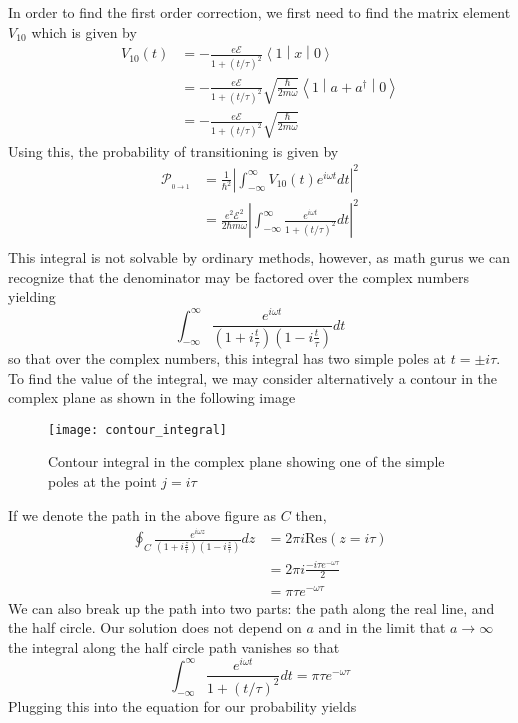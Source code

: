 \documentclass[a4paper, 11pt]{article}
\newcommand{\E}{\mathcal{E}}
\newcommand{\prob}[2]{\mathcal{P}_{_{#1\rightarrow #2}}}
\newcommand{\matrixel}[3]{\ensuremath{\left\langle #1 \middle| #2 \middle| #3 \right\rangle}}
\newenvironment{solution}{%
	\begin{list}{}{%
			\setlength{\topsep}{0pt}%
			\setlength{\leftmargin}{0.5cm}%
			\setlength{\rightmargin}{0.5cm}%
			\setlength{\listparindent}{\parindent}%
			\setlength{\itemindent}{\parindent}%
			\setlength{\parsep}{\parskip}%
		}%
		\item[]}{\end{list}}
\begin{document}
\begin{enumerate}[leftmargin=0em, label=\textbf{\arabic*}]
    \begin{solution}
      In order to find the first order correction, we first need to find the
      matrix element $V_{10}$ which is given by
      \begin{align}
        V_{10}(t) &= -\frac{e\E}{1+(t/\tau)^2}\matrixel{1}{x}{0}\\
                  &= -\frac{e\E}{1+(t/\tau)^2}\sqrt{\frac{\hbar}{2m\omega}}\matrixel{1}{a+a^\dagger}{0}\\
                  &= -\frac{e\E}{1+(t/\tau)^2}\sqrt{\frac{\hbar}{2m\omega}}
      \end{align}
      Using this, the probability of transitioning is given by
      \begin{align}
        \prob{0}{1} &= \frac{1}{\hbar^2}\left|\int_{-\infty}^\infty  V_{10}(t)e^{i\omega t}dt   \right|^2 \\
                    &= \frac{e^2\E^2}{2\hbar m\omega}\left|\int_{-\infty}^\infty  \frac{e^{i\omega t}}{1+(t/\tau)^2}dt   \right|^2 \\
      \end{align}
      This integral is not solvable by ordinary methods, however, as math gurus
      we can recognize that the denominator may be factored over the complex
      numbers yielding
      \begin{equation}
        \int_{-\infty}^\infty \frac{e^{i\omega t}}{(1+i\frac{t}{\tau})(1-i\frac{t}{\tau})}dt
      \end{equation}
      so that over the complex numbers, this integral has two simple poles at
      $t=\pm i\tau$. To find the value of the integral, we may consider
      alternatively a contour in the complex plane as shown in the following
      image \\
      \begin{figure}[!hbt]
        \centering
        \texttt{[image: contour\_integral]}
        \caption{Contour integral in the complex plane showing one of the simple
        poles at the point $j=i\tau$}
      \end{figure}

      If we denote the path in the above figure as $C$ then,
      \begin{align}
        \oint_C \frac{e^{i\omega z}}{(1+i\frac{z}{\tau})(1-i\frac{z}{\tau})}dz &= 2\pi i\text{Res}(z=i\tau)\\
                                                                               &= 2\pi i \frac{-i\tau e^{-\omega\tau}}{2} \\
        &= \pi\tau e^{-\omega \tau}
      \end{align}
      We can also break up the path into two parts: the path along the real
      line, and the half circle. Our solution does not depend on $a$ and in the
      limit that $a\rightarrow \infty$ the integral along the half circle path
      vanishes so that
      \begin{equation}
        \int_{-\infty}^\infty \frac{e^{i\omega t}}{1+(t/\tau)^2}dt = \pi\tau e^{-\omega \tau}
      \end{equation}
      Plugging this into the equation for our probability yields


\end{solution}
\end{enumerate}
\end{document}
